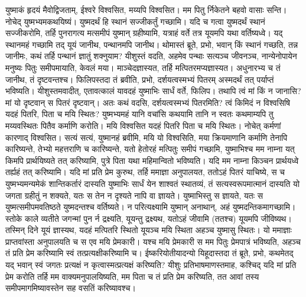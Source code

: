 \adhyAya
{}
\vakya युष्माकं हृदयं मैवोद्विजताम्, ईश्वरे विश्वसित, मय्यपि विश्वसित।
\vakya मम पितु र्निकेतने बहवो वासाः सन्ति। नोचेद् युष्मभ्यमकथयिष्यं। युष्मदर्थं हि स्थानं सज्जीकर्तुं गच्छामि।
\vakya यदि च गत्वा युष्मदर्थं स्थानं सज्जीकरोमि, तर्हि पुनरागत्य मत्समीपं युष्मान् ग्रहीष्यामि, यत्राहं वर्ते तत्र यूयमपि यथा वर्तिष्यध्वे।
\vakya यद् स्थानमहं गच्छामि तद् यूयं जानीथ, पन्थानमपि जानीथ।
\vakya थोमास्तं ब्रूते, प्रभो, भवान् किं स्थानं गच्छति, तन्न जानीमः, कथं तर्हि पन्थानं ज्ञातुं शक्नुयाम?
\vakya यीशुस्तं वदति, अहमेव पन्थाः सत्यञ्च जीवनञ्च, नान्येनोपायेन मनुष्यः पितुः समीपमायाति, केवलं मया।
\vakya माञ्चेदज्ञास्यत, तर्हि मत्पितरमप्यज्ञास्यत। अधुनारभ्य च तं जानीथ, तं दृष्टवन्तश्च।
\vakya फिलिपस्तदा तं ब्रवीति, प्रभो, दर्शयत्वस्मभ्यं पितरम् अस्मदर्थं तत् पर्याप्तं भविष्यति।
\vakya यीशुस्तमवादीत्, एतावत्कालं यावदहं युष्माभिः सार्धं वर्ते, फिलिप। तथापि त्वं मां किं न जानासि? मां यो दृष्टवान् स पितरं दृष्टवान्। अतः कथं वदसि, दर्शयत्वस्मभ्यं पितरमिति?
\vakya त्वं किमिदं न विश्वसिषि यदहं पितरि, पिता च मयि स्थितः? युष्मभ्यमहं यानि वचांसि कथयामि तानि न स्वतः कथमाम्यपि तु मय्यवस्थितः पितैव कर्माणि करोति।
\vakya मयि विश्वसित यदहं पितरि पिता च मयि स्थितः। नोचेत् कर्मणां कारणाद् विश्वसित।
\vakya सत्यं सत्यं, युष्मानहं ब्रवीमि, मयि यो विश्वसिति, मया क्रियमाणानि कर्माणि तेनापि कारिष्यन्ते, तेभ्यो महत्तराणि च कारिष्यन्ते, यतो हेतोरहं मत्पितुः समीपं गच्छामि,
\vakya युष्माभिश्च मम नाम्ना यत् किमपि प्रार्थयिष्यते तत् करिष्यामि, पुत्रे पिता यथा महिमान्वितो भविष्यति।
\vakya यदि मम नाम्ना किञ्चन प्रार्थयध्वे तर्ह्यहं तत् करिष्यामि।
\vakya यदि मां प्रति प्रेम कुरुथ, तर्हि ममाज्ञा अनुपालयत,
\vakya ततोऽहं पितरं याचिष्ये, स च युष्मभ्यमन्यमेकं शान्तिकर्तारं दास्यति युष्माभिः सार्धं येन शाश्वतं स्थातव्यं,
\vakya तं सत्यस्वरूपमात्मानं दास्यति यो जगता ग्रहीतुं न शक्यते, यतः स तेन न दृश्यते नापि वा ज्ञायते। युष्माभिस्तु स ज्ञायते, यतः स युष्मत्समीपमवतिष्ठते युष्मदन्तश्च वर्तिष्यते।
\vakya न परित्यक्ष्यामि युष्मान् अनाथान्, अहं युष्मदन्तिकमागच्छामि।
\vakya स्तोके काले व्यतीते जगन्मां पुन र्न द्रक्ष्यति, यूयन्तु द्रक्ष्यथ, यतोऽहं जीवामि (ततश्च) यूयमपि जीविष्यथ।
\vakya तस्मिन् दिने यूयं ज्ञास्यथ, यदहं मत्पितरि स्थितो यूयञ्च मयि स्थिता अहञ्च युष्मासु स्थितः।
\vakya यो ममाज्ञाः प्राप्तवांस्ता अनुपालयति च स एव मयि प्रेमकारी। यश्च मयि प्रेमकारी स मम पितुः प्रेमपात्रं भविष्यति, अहञ्च तं प्रति प्रेम करिष्यामि स्वं तत्प्रत्यक्षीकरिष्यामि च।
\vakya ईष्करियोतीयादन्यो यिहूदास्तदा तं ब्रूते, प्रभो, कथमेतद् यद् भवान् स्वं जगतः प्रत्यक्षं न कृत्वास्मत्प्रत्यक्षं करिष्यति?
\vakya यीशुः प्रतिभाषमाणस्तमाह, कश्चिद् यदि मां प्रति प्रेम करोति तर्हि मम वाक्यमनुपालयिष्यति, मम पिता च तं प्रति प्रेम करिष्यति, तत आवां तस्य समीपमागमिष्यावस्तेन सह वसतिं करिष्यावश्च।
